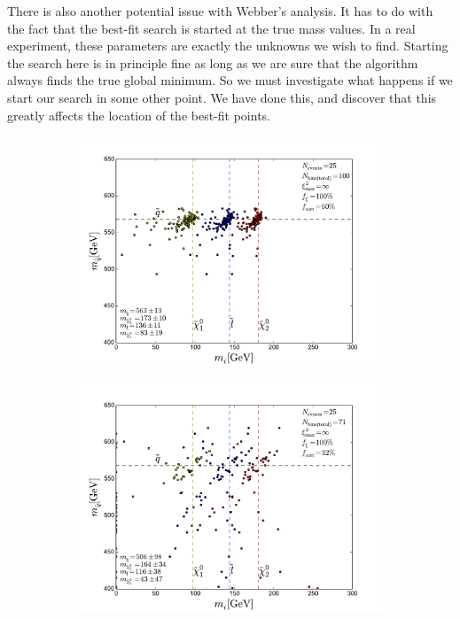 \documentclass[twoside,english]{uiofysmaster}
\begin{document}
There is also another potential issue with Webber's analysis. It has to do with the fact that the best-fit search is started at the true mass values.  In a real experiment, these parameters are exactly the unknowns we wish to find. Starting the search here is in principle fine as long as we are sure that the algorithm always finds the true global minimum. So we must investigate what happens if we start our search in some other point. We have done this, and discover that this greatly affects the location of the best-fit points.
\begin{figure}[hbt]
	\centering
	\begin{subfigure}[b]{0.45\textwidth}
		\includegraphics[width=\textwidth]{figures/webber_rec_table/webber_HW-rec_nocut.pdf} 
		\caption{ }
	\end{subfigure}
	\begin{subfigure}[b]{0.45\textwidth}
		\includegraphics[width=\textwidth]{figures/webber_rec_table/webber-rec_wrong_starting_point-400-300-200-100_lowtol.pdf}
		\caption{ } 
	\end{subfigure}


\end{figure}
\end{document}
